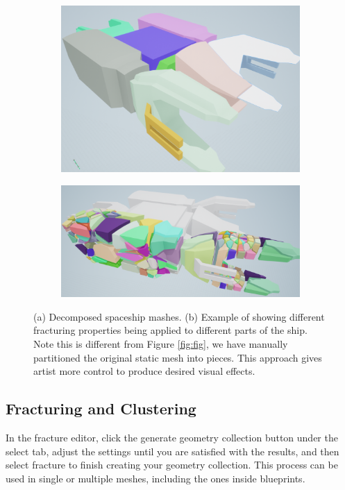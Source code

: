 \documentclass[sigconf]{acmart}
\begin{document}
\begin{figure}
\begin{subfigure}{.5\textwidth}
  \centering
  \includegraphics[width=.9\linewidth]{aaafiles/decomposition.png}
  \caption{}
\end{subfigure}%
\begin{subfigure}{.5\textwidth}
  \centering
  \includegraphics[width=.9\linewidth]{aaafiles/dec2.png}
  \caption{}
\end{subfigure}
\caption{(a) Decomposed spaceship mashes. (b) Example of showing different fracturing properties being applied to different parts of the ship. Note this is different from Figure \ref{fig:fig}, we have manually partitioned the original static mesh into pieces. This approach gives artist more control to produce desired visual effects. }
\label{fig:decomposition}
\end{figure}

\subsection{Fracturing and Clustering}

In the fracture editor, click the generate geometry collection button under the select tab, adjust the settings until you are satisfied with the results, and then select fracture to finish creating your geometry collection. This process can be used in single or multiple meshes, including the ones inside blueprints.
\end{document}
